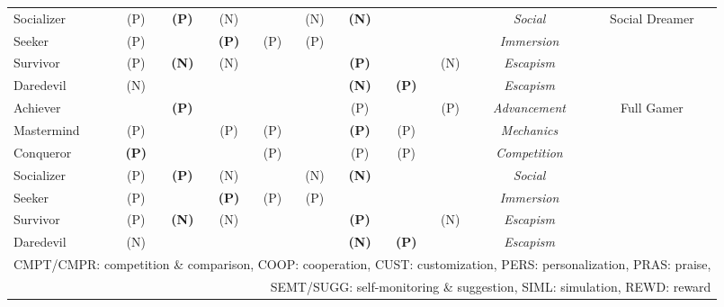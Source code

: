 \begin{quadro}[htb]
\begin{tabular}{|l|cccccccc|c|c|}
Socializer&(P)&\textbf{(P)}&(N)& &(N)&\textbf{(N)}& & &\emph{Social}&\multirow{4}{*}{Social Dreamer}\tabularnewline
Seeker&(P)& &\textbf{(P)}&(P)&(P)& & & &\emph{Immersion}&\tabularnewline
Survivor&(P)&\textbf{(N)}&(N)& & &\textbf{(P)}& &(N)&\emph{Escapism}&\tabularnewline
Daredevil&(N)& & & & &\textbf{(N)}&\textbf{(P)}& &\emph{Escapism}&\tabularnewline
\hline

Achiever& &\textbf{(P)}& & & &(P)& &(P)&\emph{Advancement}&\multirow{7}{*}{Full Gamer}\tabularnewline
Mastermind&(P)& &(P)&(P)& &\textbf{(P)}&(P)& &\emph{Mechanics}& \tabularnewline
Conqueror&\textbf{(P)}& & &(P)& &(P)&(P)& &\emph{Competition}& \tabularnewline
Socializer&(P)&\textbf{(P)}&(N)& &(N)&\textbf{(N)}& & &\emph{Social}&\tabularnewline
Seeker&(P)& &\textbf{(P)}&(P)&(P)& & & &\emph{Immersion}&\tabularnewline
Survivor&(P)&\textbf{(N)}&(N)& & &\textbf{(P)}& &(N)&\emph{Escapism}& \tabularnewline
Daredevil&(N)& & & & &\textbf{(N)}&\textbf{(P)}& &\emph{Escapism}& \tabularnewline
\hline

\multicolumn{11}{r}{CMPT/CMPR: competition \& comparison, COOP: cooperation, CUST: customization, PERS: personalization, PRAS: praise,}\tabularnewline
\multicolumn{11}{r}{SEMT/SUGG: self-monitoring \& suggestion, SIML: simulation, REWD: reward}

\end{tabular}
\fautor
\end{quadro}







